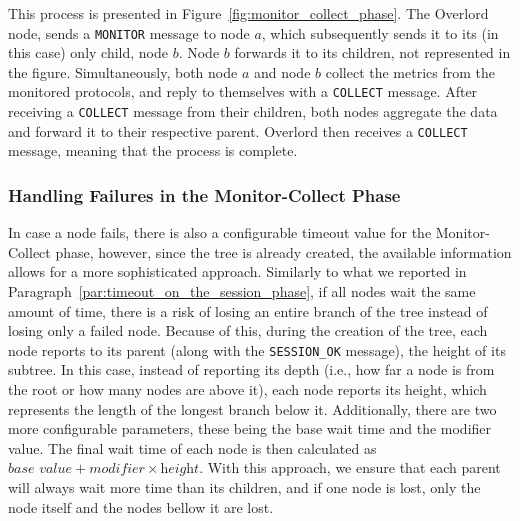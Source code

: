This process is presented in Figure~\ref{fig:monitor_collect_phase}. The Overlord node, sends a \texttt{MONITOR} message to node $a$, which subsequently sends it to its (in this case) only child, node $b$. Node $b$ forwards it to its children, not represented in the figure. Simultaneously, both node $a$ and node $b$ collect the metrics from the monitored protocols, and reply to themselves with a \texttt{COLLECT} message. After receiving a \texttt{COLLECT} message from their children, both nodes aggregate the data and forward it to their respective parent. Overlord then receives a \texttt{COLLECT} message, meaning that the process is complete.

\subsubsection{Handling Failures in the Monitor-Collect Phase}
\label{sssec:handling_failures_in_the_monitor_collect_phase}

In case a node fails, there is also a configurable timeout value for the Monitor-Collect phase, however, since the tree is already created, the available information allows for a more sophisticated approach. Similarly to what we reported in Paragraph~\ref{par:timeout_on_the_session_phase}, if all nodes wait the same amount of time, there is a risk of losing an entire branch of the tree instead of losing only a failed node. Because of this, during the creation of the tree, each node reports to its parent (along with the \texttt{SESSION\_OK} message), the height of its subtree. In this case, instead of reporting its depth (i.e., how far a node is from the root or how many nodes are above it), each node reports its height, which represents the length of the longest branch below it. Additionally, there are two more configurable parameters, these being the base wait time and the modifier value. The final wait time of each node is then calculated as $ \textit{base value} + \textit{modifier}\times \textit{height}$. With this approach, we ensure that each parent will always wait more time than its children, and if one node is lost, only the node itself and the nodes bellow it are lost.

